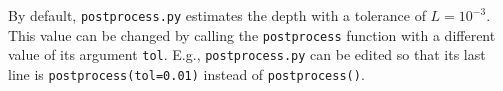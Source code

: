 \documentclass[entropy,article,accept,oneauthor,pdftex,10pt,a4paper]{mdpi}
\begin{document}
By default, {\tt postprocess.py} estimates the depth with a tolerance of
$L=10^{-3}$. This value can be changed by calling the {\tt postprocess}
function with a different value of its argument {\tt tol}. E.g.,
{\tt postprocess.py} can be edited so that its last line is
{\tt postprocess(tol=0.01)} instead of {\tt postprocess()}.



%

\end{document}
